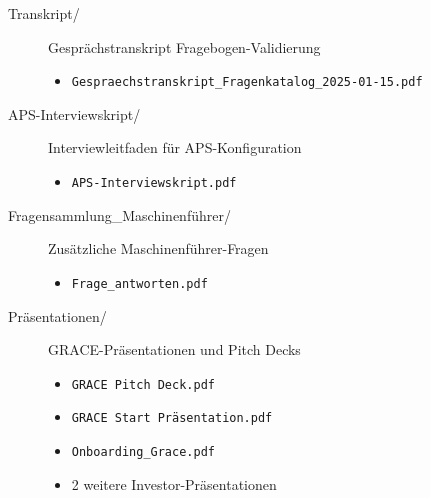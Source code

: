 \begin{description}
\item[Transkript/] Gesprächstranskript Fragebogen-Validierung
\begin{itemize}
    \item \texttt{Gespraechstranskript\_Fragenkatalog\_2025-01-15.pdf}
\end{itemize}

\item[APS-Interviewskript/] Interviewleitfaden für APS-Konfiguration
\begin{itemize}
    \item \texttt{APS-Interviewskript.pdf}
\end{itemize}

\item[Fragensammlung\_Maschinenführer/] Zusätzliche Maschinenführer-Fragen
\begin{itemize}
    \item \texttt{Frage\_antworten.pdf}
\end{itemize}

\item[Präsentationen/] GRACE-Präsentationen und Pitch Decks
\begin{itemize}
    \item \texttt{GRACE Pitch Deck.pdf}
    \item \texttt{GRACE Start Präsentation.pdf}
    \item \texttt{Onboarding\_Grace.pdf}
    \item 2 weitere Investor-Präsentationen
\end{itemize}
\end{description}